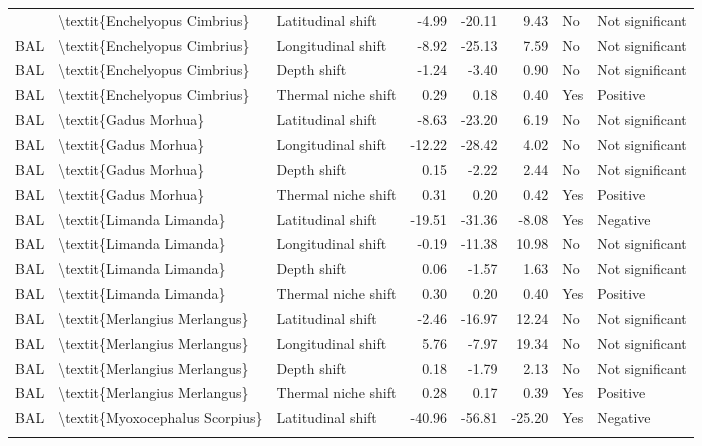 \begin{longtable}[t]{lllrrrll}
{{\endfoot
\bottomrule
\endlastfoot
BAL & \textbackslash{}textit\{Enchelyopus Cimbrius\} & Latitudinal shift & -4.99 & -20.11 & 9.43 & No & Not significant\\
BAL & \textbackslash{}textit\{Enchelyopus Cimbrius\} & Longitudinal shift & -8.92 & -25.13 & 7.59 & No & Not significant\\
BAL & \textbackslash{}textit\{Enchelyopus Cimbrius\} & Depth shift & -1.24 & -3.40 & 0.90 & No & Not significant\\
BAL & \textbackslash{}textit\{Enchelyopus Cimbrius\} & Thermal niche shift & 0.29 & 0.18 & 0.40 & Yes & Positive\\
BAL & \textbackslash{}textit\{Gadus Morhua\} & Latitudinal shift & -8.63 & -23.20 & 6.19 & No & Not significant\\
\addlinespace
BAL & \textbackslash{}textit\{Gadus Morhua\} & Longitudinal shift & -12.22 & -28.42 & 4.02 & No & Not significant\\
BAL & \textbackslash{}textit\{Gadus Morhua\} & Depth shift & 0.15 & -2.22 & 2.44 & No & Not significant\\
BAL & \textbackslash{}textit\{Gadus Morhua\} & Thermal niche shift & 0.31 & 0.20 & 0.42 & Yes & Positive\\
BAL & \textbackslash{}textit\{Limanda Limanda\} & Latitudinal shift & -19.51 & -31.36 & -8.08 & Yes & Negative\\
BAL & \textbackslash{}textit\{Limanda Limanda\} & Longitudinal shift & -0.19 & -11.38 & 10.98 & No & Not significant\\
\addlinespace
BAL & \textbackslash{}textit\{Limanda Limanda\} & Depth shift & 0.06 & -1.57 & 1.63 & No & Not significant\\
BAL & \textbackslash{}textit\{Limanda Limanda\} & Thermal niche shift & 0.30 & 0.20 & 0.40 & Yes & Positive\\
BAL & \textbackslash{}textit\{Merlangius Merlangus\} & Latitudinal shift & -2.46 & -16.97 & 12.24 & No & Not significant\\
BAL & \textbackslash{}textit\{Merlangius Merlangus\} & Longitudinal shift & 5.76 & -7.97 & 19.34 & No & Not significant\\
BAL & \textbackslash{}textit\{Merlangius Merlangus\} & Depth shift & 0.18 & -1.79 & 2.13 & No & Not significant\\
\addlinespace
BAL & \textbackslash{}textit\{Merlangius Merlangus\} & Thermal niche shift & 0.28 & 0.17 & 0.39 & Yes & Positive\\
BAL & \textbackslash{}textit\{Myoxocephalus Scorpius\} & Latitudinal shift & -40.96 & -56.81 & -25.20 & Yes & Negative\\
}}
\end{longtable}

